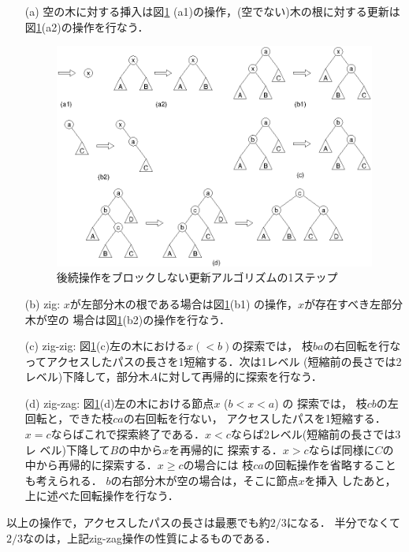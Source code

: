 \documentclass[T]{compsoft}
\begin{document}
\begin{itemize}
\item[(a)]
空の木に対する挿入は図\ref{figure:update}
(a1)の操作，(空でない)木の根に対する更新は
図\ref{figure:update}(a2)の操作を行なう．

\begin{figure}[t]
  \centerline {\includegraphics {images/fig3.eps}}
\caption{後続操作をブロックしない更新アルゴリズムの1ステップ}
\label{figure:update}
\end{figure}

\item[(b)]
zig: 
$x$が左部分木の根である場合は図\ref{figure:update}(b1)
の操作，$x$が存在すべき左部分木が空の
場合は図\ref{figure:update}(b2)の操作を行なう．

\item[(c)]
zig-zig: 図\ref{figure:update}(c)左の木における$x (<b)$の探索では，
枝$ba$の右回転を行なってアクセスしたパスの長さを1短縮する．次は1レベル
(短縮前の長さでは2レベル)下降して，部分木$A$に対して再帰的に探索を行なう．

\item[(d)]
zig-zag: 図\ref{figure:update}(d)左の木における節点$x$ ($b<x<a$) の
探索では，
枝$cb$の左回転と，できた枝$ca$の右回転を行ない，
アクセスしたパスを1短縮する．
%
%
$x=c$ならばこれで探索終了である．$x<c$ならば2レベル(短縮前の長さでは3レ
ベル)下降して$B$の中から$x$を再帰的に
探索する．$x>c$ならば同様に$C$の中から再帰的に探索する．$x\ge c$の場合には
枝$ca$の回転操作を省略することも考えられる．
%
$b$の右部分木が空の場合は，そこに節点$x$を挿入
したあと，上に述べた回転操作を行なう．

\end{itemize}
以上の操作で，アクセスしたパスの長さは最悪でも約$2/3$になる．
%
半分でなくて$2/3$なのは，上記zig-zag操作の性質によるものである．
\end{document}
